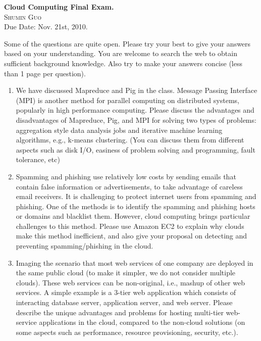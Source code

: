 \documentclass{article}
\begin{document}
\begin{center}
\textbf{\textup{\LARGE Cloud Computing Final Exam.}} \\
\textsc{Shumin Guo} \\
\small{Due Date: Nov. 21st, 2010.}
\end{center}

Some of the questions are quite open. Please try your best to give
your answers based on your understanding. You are welcome to search
the web to obtain sufficient background knowledge. Also try to make
your answers concise (less than 1 page per question).   

\begin{enumerate}
\item We have discussed Mapreduce and Pig in the class. Message Passing
Interface (MPI) is another method for parallel computing on
distributed systems, popularly in high performance computing. Please
discuss the advantages and disadvantages of Mapreduce, Pig, and MPI
for solving two types of problems: aggregation style data analysis
jobs and iterative machine learning algorithms, e.g., k-means
clustering. (You can discuss them from different aspects such as disk
I/O, easiness of problem solving and programming, fault tolerance,
etc)


\item Spamming and phishing use relatively low costs by sending emails
that contain false information or advertisements, to take advantage of
careless email receivers. It is challenging to protect internet users
from spamming and phishing. One of the methods is to identify the
spamming and phishing hosts or domains and blacklist them. However,
cloud computing brings particular challenges to this method. Please
use Amazon EC2 to explain why clouds make this method inefficient, and
also give your proposal on detecting and preventing spamming/phishing
in the cloud. 


\item Imaging the scenario that most web services of one company are
deployed in the same public cloud (to make it simpler, we do not
consider multiple clouds). These web services can be non-original,
i.e., mashup of other web services. A simple example is a 3-tier web
application which consists of interacting database server, application
server, and web server. Please describe the unique advantages and
problems for hosting multi-tier web-service applications in the cloud,
compared to the non-cloud solutions (on some aspects such as
performance, resource provisioning, security, etc.).  

\end{enumerate}
\end{document}
